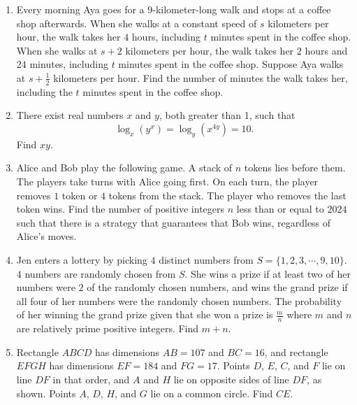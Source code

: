 \documentclass{article}
\begin{document}
\begin{enumerate}[label=\arabic*., itemsep=0.5em]\item Every morning Aya goes for a \(9\)-kilometer-long walk and stops at a coffee shop afterwards. When she walks at a constant speed of \(s\) kilometers per hour, the walk takes her \(4\) hours, including \(t\) minutes spent in the coffee shop. When she walks at \(s + 2\) kilometers per hour, the walk takes her \(2\) hours and \(24\) minutes, including \(t\) minutes spent in the coffee shop. Suppose Aya walks at \(s + \frac{1}{2}\)
kilometers per hour. Find the number of minutes the walk takes her, including the \(t\) minutes spent in the coffee shop.\par \vspace{0.5em}\item There exist real numbers \(x\) and \(y\), both greater than 1, such that 
\begin{equation*}
\log_x(y^x) = \log_y(x^{4y}) = 10.
\end{equation*}
 Find \(xy\).\par \vspace{0.5em}\item Alice and Bob play the following game. A stack of \(n\) tokens lies before them. The players take turns with Alice going first. On each turn, the player removes \(1\) token or \(4\) tokens from the stack. The player who removes the last token wins. Find the number of positive integers \(n\) less than or equal to \(2024\) such that there is a strategy that guarantees that Bob wins, regardless of Alice's moves.\par \vspace{0.5em}\item Jen enters a lottery by picking \(4\) distinct numbers from \(S=\{1,2,3,\cdots,9,10\}.\) \(4\) numbers are randomly chosen from \(S.\) She wins a prize if at least two of her numbers were \(2\) of the randomly chosen numbers, and wins the grand prize if all four of her numbers were the randomly chosen numbers. The probability of her winning the grand prize given that she won a prize is \(\tfrac{m}{n}\) where \(m\) and \(n\) are relatively prime positive integers. Find \(m+n\).\par \vspace{0.5em}\item Rectangle \(ABCD\) has dimensions \(AB = 107\) and \(BC = 16\), and rectangle \(EFGH\) has dimensions \(EF = 184\) and \(FG = 17\). Points \(D\), \(E\), \(C\), and \(F\) lie on line \(DF\) in that order, and \(A\) and \(H\) lie on opposite sides of line \(DF\), as shown. Points \(A\), \(D\), \(H\), and \(G\) lie on a common circle. Find \(CE\).



\end{enumerate}
\end{document}
